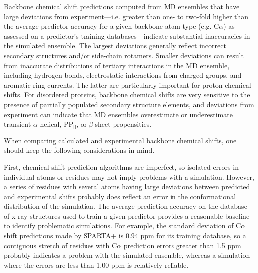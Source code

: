 \documentclass[9pt,review]{livecoms}
\begin{document}
Backbone chemical shift predictions computed from MD ensembles that have large deviations from experiment---i.e. greater than one- to two-fold higher than the average predictor accuracy for a given backbone atom type (e.g. C$\alpha$) as assessed on a predictor’s training databases---indicate substantial inaccuracies in the simulated ensemble.
The largest deviations generally reflect incorrect secondary structures and/or side-chain rotamers.
Smaller deviations can result from inaccurate distributions of tertiary interactions in the MD ensemble, including hydrogen bonds, electrostatic interactions from charged groups, and aromatic ring currents.
The latter are particularly important for proton chemical shifts.
For disordered proteins, backbone chemical shifts are very sensitive to the presence of partially populated secondary structure elements, and deviations from experiment can indicate that MD ensembles overestimate or underestimate transient $\alpha$-helical, PP$_\mathsf{II}$, or $\beta$-sheet propensities.

When comparing calculated and experimental backbone chemical shifts, one should keep the following considerations in mind.

First, chemical shift prediction algorithms are imperfect, so isolated errors in individual atoms or residues may not imply problems with a simulation.
However, a series of residues with several atoms having large deviations between predicted and experimental shifts probably does reflect an error in the conformational distribution of the simulation.
The average prediction accuracy on the database of x-ray structures used to train a given predictor provides a reasonable baseline to identify problematic simulations.
For example, the standard deviation of C$\alpha$ shift predictions made by SPARTA+ is 0.94 ppm for its training database, so a contiguous stretch of residues with C$\alpha$ prediction errors greater than 1.5 ppm probably indicates a problem with the simulated ensemble, whereas a simulation where the errors are less than 1.00 ppm is relatively reliable.
\end{document}
